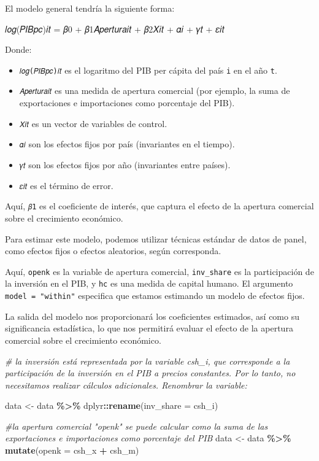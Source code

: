 \documentclass[
]{article}
\newenvironment{Shaded}{\begin{snugshade}}{\end{snugshade}}
\newcommand{\AttributeTok}[1]{\textcolor[rgb]{0.13,0.29,0.53}{#1}}
\newcommand{\CommentTok}[1]{\textcolor[rgb]{0.56,0.35,0.01}{\textit{#1}}}
\newcommand{\FunctionTok}[1]{\textcolor[rgb]{0.13,0.29,0.53}{\textbf{#1}}}
\newcommand{\NormalTok}[1]{#1}
\newcommand{\OtherTok}[1]{\textcolor[rgb]{0.56,0.35,0.01}{#1}}
\newcommand{\SpecialCharTok}[1]{\textcolor[rgb]{0.81,0.36,0.00}{\textbf{#1}}}
\providecommand{\tightlist}{%
  \setlength{\itemsep}{0pt}\setlength{\parskip}{0pt}}
\begin{document}
El modelo general tendría la siguiente forma:

𝑙𝑜𝑔(𝑃𝐼𝐵𝑝𝑐)𝑖𝑡 = 𝛽0 + 𝛽1𝐴𝑝𝑒𝑟𝑡𝑢𝑟𝑎𝑖𝑡 + 𝛽2𝑋𝑖𝑡 + 𝛼𝑖 + 𝛾𝑡 + 𝜀𝑖𝑡

Donde:

\begin{itemize}
\tightlist
\item
  \texttt{𝑙𝑜𝑔(𝑃𝐼𝐵𝑝𝑐)𝑖𝑡} es el logaritmo del PIB per cápita del país
  \texttt{i} en el año \texttt{t}.
\item
  \texttt{𝐴𝑝𝑒𝑟𝑡𝑢𝑟𝑎𝑖𝑡} es una medida de apertura comercial (por ejemplo,
  la suma de exportaciones e importaciones como porcentaje del PIB).
\item
  \texttt{𝑋𝑖𝑡} es un vector de variables de control.
\item
  \texttt{𝛼𝑖} son los efectos fijos por país (invariantes en el tiempo).
\item
  \texttt{𝛾𝑡} son los efectos fijos por año (invariantes entre países).
\item
  \texttt{𝜀𝑖𝑡} es el término de error.
\end{itemize}

Aquí, \texttt{𝛽1} es el coeficiente de interés, que captura el efecto de
la apertura comercial sobre el crecimiento económico.

Para estimar este modelo, podemos utilizar técnicas estándar de datos de
panel, como efectos fijos o efectos aleatorios, según corresponda.

Aquí, \texttt{openk} es la variable de apertura comercial,
\texttt{inv\_share} es la participación de la inversión en el PIB, y
\texttt{hc} es una medida de capital humano. El argumento
\texttt{model\ =\ "within"} especifica que estamos estimando un modelo
de efectos fijos.

La salida del modelo nos proporcionará los coeficientes estimados, así
como su significancia estadística, lo que nos permitirá evaluar el
efecto de la apertura comercial sobre el crecimiento económico.

\begin{Shaded}
\begin{Highlighting}[]
\CommentTok{\# la inversión está representada por la variable csh\_i, que corresponde a la participación de la inversión en el PIB a precios constantes. Por lo tanto, no necesitamos realizar cálculos adicionales. Renombrar la variable:}

\NormalTok{data }\OtherTok{\textless{}{-}}\NormalTok{ data }\SpecialCharTok{\%\textgreater{}\%}
\NormalTok{  dplyr}\SpecialCharTok{::}\FunctionTok{rename}\NormalTok{(}\AttributeTok{inv\_share =}\NormalTok{ csh\_i)}

\CommentTok{\#la apertura comercial "openk" se puede calcular como la suma de las exportaciones e importaciones como porcentaje del PIB}
\NormalTok{data }\OtherTok{\textless{}{-}}\NormalTok{ data }\SpecialCharTok{\%\textgreater{}\%}
  \FunctionTok{mutate}\NormalTok{(}\AttributeTok{openk =}\NormalTok{ csh\_x }\SpecialCharTok{+}\NormalTok{ csh\_m) }
\end{Highlighting}
\end{Shaded}
\end{document}
